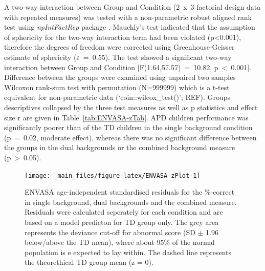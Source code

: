 \documentclass[a4paper, twoside]{templates/ociamthesis}
\begin{document}
A two-way interaction between Group and Condition (2~x~3 factorial design data with repeated measures) was tested with a non-parametric robust aligned rank test using \emph{npIntFactRep} package \autocite{npIntFactRepPackageR}. Mauchly's test indicated that the assumption of sphericity for the two-way interaction term had been violated (p\textless0.001), therefore the degrees of freedom were corrected using Greenhouse-Geisser estimate of sphericity (\(\varepsilon\)~=~0.55). The test showed a significant two-way interaction between Group and Condition {[}F(1.64,57.57)~=~10.82, p~\textless~0.001{]}. Difference between the groups were examined using unpaired two samples Wilcoxon rank-sum test with permutation (N=999999) which is a t-test equivalent for non-parametric data (`coin::wilcox\_test()'; REF). Groups descriptives collapsed by the three test measures as well as p statistics and effect size r are given in Table~\ref{tab:ENVASA-zTab}. APD children performance was significantly poorer than of the TD children in the single background condition (p~=~0.02, moderate effect), whereas there was no significant difference between the groups in the dual backgrounds or the combined background measure (p~\textgreater~0.05).

\begin{figure}

{\centering \texttt{[image: \_main\_files/figure-latex/ENVASA-zPlot-1]} 

}

\caption{ENVASA age-independent standardised residuals for the \%-correct in single background, dual backgrounds and the combined measure. Residuals were calculated seperately for each condition and are based on a model predicton for TD group only. The grey area represents the deviance cut-off for abnormal score (SD $\pm$ 1.96 below/above the TD mean), where about 95\% of the normal population is e expected to lay within. The dashed line represents the theorethical TD group mean (z = 0).}\label{fig:ENVASA-zPlot}
\end{figure}
\end{document}
